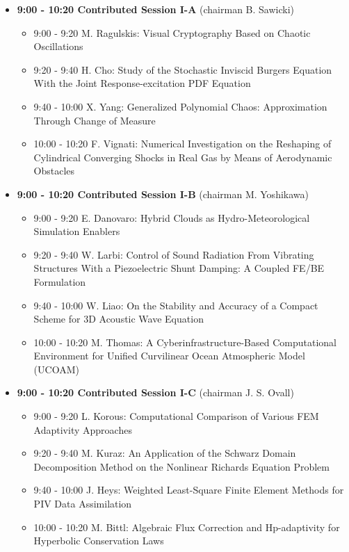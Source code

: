 \documentclass[10pt, A4]{article}%
\begin{document}
\begin{itemize}    
  \item {\bf 9:00 - 10:20 Contributed Session I-A} (chairman B. Sawicki) 
  \begin{itemize}
    \item 9:00 - 9:20 {M. Ragulskis}: {Visual Cryptography Based on Chaotic Oscillations}  %
    \item 9:20 - 9:40 {H. Cho}: {Study of the Stochastic Inviscid Burgers Equation With the Joint Response-excitation PDF Equation}
    \item 9:40 - 10:00 {X. Yang}: {Generalized Polynomial Chaos: Approximation Through Change of Measure}
    \item 10:00 - 10:20 {F. Vignati}: {Numerical Investigation on the Reshaping of Cylindrical Converging Shocks in Real Gas by Means of Aerodynamic Obstacles}
  \end{itemize}
  \item {\bf 9:00 - 10:20 Contributed Session I-B} (chairman M. Yoshikawa) 
  \begin{itemize}
    \item 9:00 - 9:20 {E. Danovaro}: {Hybrid Clouds as Hydro-Meteorological Simulation Enablers}
    \item 9:20 - 9:40 {W. Larbi}: {Control of Sound Radiation From Vibrating Structures With a Piezoelectric Shunt Damping: A Coupled FE/BE Formulation}
    \item 9:40 - 10:00 {W. Liao}: {On the Stability and Accuracy of a Compact Scheme for 3D Acoustic Wave Equation}
    \item 10:00 - 10:20 {M. Thomas}: {A Cyberinfrastructure-Based Computational Environment for Unified Curvilinear Ocean Atmospheric Model  (UCOAM)}
  \end{itemize}
    \item {\bf 9:00 - 10:20 Contributed Session I-C} (chairman J. S. Ovall) 
  \begin{itemize}
    \item 9:00 - 9:20 {L. Korous}: {Computational Comparison of Various FEM Adaptivity Approaches}
    \item 9:20 - 9:40 {M. Kuraz}: {An Application of the Schwarz Domain Decomposition Method on the Nonlinear Richards Equation Problem}
    \item 9:40 - 10:00 {J. Heys}: {Weighted Least-Square Finite Element Methods for PIV Data Assimilation}
    \item 10:00 - 10:20 {M. Bittl}: {Algebraic Flux Correction and Hp-adaptivity for Hyperbolic Conservation Laws}

\end{itemize}
\end{itemize}
\end{document}
